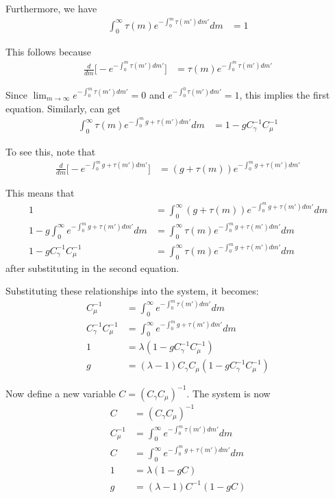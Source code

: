 \documentclass[12pt,english]{article}
\theoremstyle{remark}
\begin{document}
Furthermore, we have 
\begin{align*}
	\int_{0}^{\infty} \tau(m) e^{-\int_0^m \tau(m')dm'} dm &= 1 
\end{align*}

This follows because 
\begin{align*}
	\frac{d}{dm} \big[ -e^{-\int_0^m \tau(m')dm'} \big] &= \tau(m)e^{-\int_0^m \tau(m')dm'}
\end{align*}

Since $\lim_{m \to \infty} e^{-\int_0^m \tau(m')dm'} = 0$ and $e^{-\int_0^0 \tau(m')dm'} = 1$, this implies the first equation. Similarly, can get
\begin{align*}
	\int_0^{\infty} \tau(m)e^{-\int_0^m g + \tau(m')dm'} dm &= 1 - g C_{\gamma}^{-1} C_{\mu}^{-1}
\end{align*}

To see this, note that
\begin{align*}
		\frac{d}{dm} \big[ -e^{-\int_0^m g + \tau(m')dm'} \big] &= (g +\tau(m))e^{-\int_0^m g + \tau(m')dm'}
\end{align*}

This means that 
\begin{align*}
	1 &= \int_0^{\infty} (g + \tau(m)) e^{-\int_0^m g+ \tau(m')dm'} dm \\
	1 - g\int_0^{\infty} e^{-\int_0^m g + \tau(m') dm'} dm &= \int_0^{\infty} \tau(m) e^{-\int_0^m g+ \tau(m')dm'} dm \\ 
	1 - g C_{\gamma}^{-1} C_{\mu}^{-1} &= \int_0^{\infty} \tau(m) e^{-\int_0^m g+ \tau(m')dm'} dm
\end{align*}
after substituting in the second equation.

Substituting these relationships into the system, it becomes:
\begin{align*}
	C_{\mu}^{-1} &= \int_0^{\infty} e^{-\int_0^m \tau(m')dm'}dm \\
	C_{\gamma}^{-1} C_{\mu}^{-1} &= \int_0^{\infty} e^{-\int_0^m g + \tau(m') dm'} dm \\
	1 &= \lambda (1 - gC_{\gamma}^{-1} C_{\mu}^{-1}) \\ 
	g &= (\lambda -1) C_{\gamma}C_{\mu} (1 - gC_{\gamma}^{-1} C_{\mu}^{-1}) 
\end{align*}

Now define a new variable $C = (C_{\gamma}C_{\mu})^{-1}$. The system is now
\begin{align*}
	C &= (C_{\gamma}C_{\mu})^{-1} \\
	C_{\mu}^{-1} &= \int_0^{\infty} e^{-\int_0^m \tau(m')dm'} dm \\
	C &= \int_0^{\infty} e^{-\int_0^m g + \tau(m') dm'} dm \\
	1 &= \lambda (1 - gC) \\
	g &= (\lambda -1) C^{-1}(1 - gC)
\end{align*}
\end{document}
